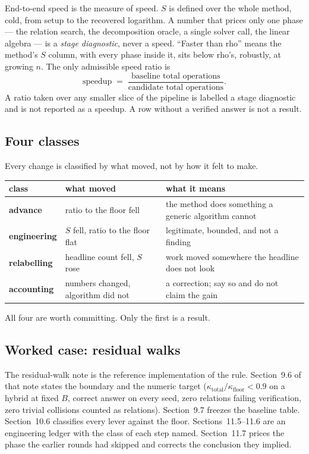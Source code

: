 End-to-end speed is the measure of speed. $S$ is defined over the
whole method, cold, from setup to the recovered logarithm. A number
that prices only one phase --- the relation search, the decomposition
oracle, a single solver call, the linear algebra --- is a \emph{stage
diagnostic}, never a speed. ``Faster than rho'' means the method's $S$
column, with every phase inside it, sits below rho's, robustly, at
growing $n$. The only admissible speed ratio is
\[
  \mathrm{speedup}
  \;=\;
  \frac{\text{baseline total operations}}
       {\text{candidate total operations}}.
\]
A ratio taken over any smaller slice of the pipeline is labelled a
stage diagnostic and is not reported as a speedup. A row without a
verified answer is not a result.

\subsection{Four classes}

Every change is classified by what moved, not by how it felt to make.

\begin{center}
\small
\begin{tabular}{@{}llp{}@{}}
\toprule
class & what moved & what it means \\
\midrule
\textbf{advance} & ratio to the floor fell
  & the method does something a generic algorithm cannot \\
\textbf{engineering} & $S$ fell, ratio to the floor flat
  & legitimate, bounded, and not a finding \\
\textbf{relabelling} & headline count fell, $S$ rose
  & work moved somewhere the headline does not look \\
\textbf{accounting} & numbers changed, algorithm did not
  & a correction; say so and do not claim the gain \\
\bottomrule
\end{tabular}
\end{center}

All four are worth committing. Only the first is a result.

\subsection{Worked case: residual walks}
\label{sec:method-residual}

The residual-walk note is the reference implementation of the rule.
Section~9.6 of that note states the boundary and the numeric target
($\kappa_{\mathrm{total}}/\kappa_{\mathrm{floor}}<0.9$ on a hybrid at
fixed $B$, correct answer on every seed, zero relations failing
verification, zero trivial collisions counted as relations).
Section~9.7 freezes the baseline table. Section~10.6 classifies every
lever against the floor. Sections~11.5--11.6 are an engineering ledger
with the class of each step named. Section~11.7 prices the phase the
earlier rounds had skipped and corrects the conclusion they
implied.

